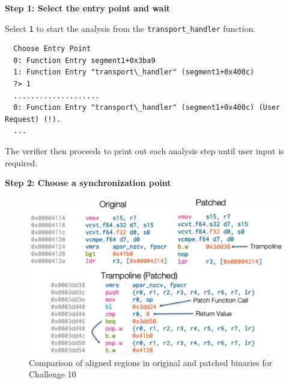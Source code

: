 \noindent\textbf{Step 1: Select the entry point and wait}

 Select \texttt{1} to start the analysis from the \texttt{transport\_handler} function.
\begin{verbatim}
  Choose Entry Point
  0: Function Entry segment1+0x3ba9
  1: Function Entry "transport\_handler" (segment1+0x400c)
  ?> 1
  ....................
  0: Function Entry "transport\_handler" (segment1+0x400c) (User Request) (!).
  ...
\end{verbatim}

 The verifier then proceeds to print out each analysis step until user
 input is required.

 \noindent\textbf{Step 2: Choose a synchronization point}

 \begin{figure}[ht]
  \centerline{\includegraphics[width=0.9\linewidth]{patch.pdf}}
  \caption{Comparison of aligned regions in original and patched
    binaries for Challenge 10}
\label{fig:aligned}
\end{figure}

